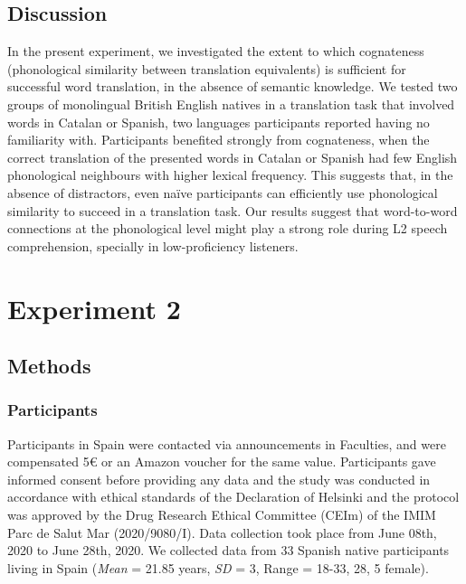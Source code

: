 \documentclass[
]{article}
\begin{document}
\subsection{Discussion}\label{discussion}

In the present experiment, we investigated the extent to which
cognateness (phonological similarity between translation equivalents) is
sufficient for successful word translation, in the absence of semantic
knowledge. We tested two groups of monolingual British English natives
in a translation task that involved words in Catalan or Spanish, two
languages participants reported having no familiarity with. Participants
benefited strongly from cognateness, when the correct translation of the
presented words in Catalan or Spanish had few English phonological
neighbours with higher lexical frequency. This suggests that, in the
absence of distractors, even naïve participants can efficiently use
phonological similarity to succeed in a translation task. Our results
suggest that word-to-word connections at the phonological level might
play a strong role during L2 speech comprehension, specially in
low-proficiency listeners.

\section{Experiment 2}\label{experiment-2}

\subsection{Methods}\label{methods-1}

\subsubsection{Participants}\label{participants-1}

Participants in Spain were contacted via announcements in Faculties, and
were compensated 5€ or an Amazon voucher for the same value.
Participants gave informed consent before providing any data and the
study was conducted in accordance with ethical standards of the
Declaration of Helsinki and the protocol was approved by the Drug
Research Ethical Committee (CEIm) of the IMIM Parc de Salut Mar
(2020/9080/I). Data collection took place from June 08th, 2020 to June
28th, 2020. We collected data from 33 Spanish native participants living
in Spain (\emph{Mean} = 21.85 years, \emph{SD} = 3, Range = 18-33, 28, 5
female).
\end{document}
